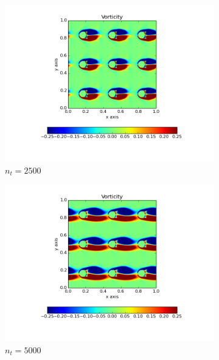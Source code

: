 \documentclass[10pt, a4paper]{article}
\begin{document}
\begin{figure}[htb!]
\centering
\begin{subfigure}{.5\textwidth}
  \centering
  \includegraphics[width=1.1\linewidth, clip=true, trim=1cm 2cm 1cm 1cm]{q1_0001}
  \caption{$n_t = 2500$}
\end{subfigure}%
\begin{subfigure}{.5\textwidth}
  \centering
  \includegraphics[width=1.1\linewidth, clip=true, trim=1cm 2cm 1cm 1cm]{q1_0002}
  \caption{$n_t = 5000$}
\end{subfigure}
\newline
\begin{subfigure}{.5\textwidth}
  \centering

\end{subfigure}
\end{figure}
\end{document}
